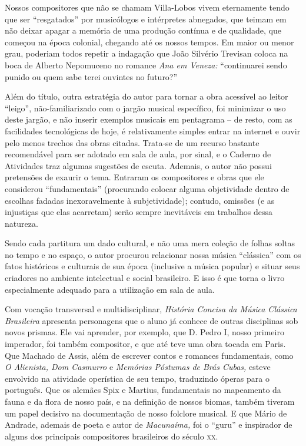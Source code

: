 \documentclass[11pt]{extarticle}
\begin{document}
Nossos compositores que não se chamam Villa-Lobos vivem eternamente
tendo que ser ``resgatados'' por musicólogos e intérpretes abnegados,
que teimam em não deixar apagar a memória de uma produção contínua e de
qualidade, que começou na época colonial, chegando até os nossos tempos.
Em maior ou menor grau, poderiam todos repetir a indagação que João
Silvério Trevisan coloca na boca de Alberto Nepomuceno no romance
\emph{Ana em Veneza:} ``continuarei sendo punido ou quem sabe terei
ouvintes no futuro?''

Além do título, outra estratégia do autor para tornar a obra acessível
ao leitor ``leigo'', não-familiarizado com o jargão musical específico,
foi minimizar o uso deste jargão, e não inserir exemplos musicais em
pentagrama -- de resto, com as facilidades tecnológicas de hoje, é
relativamente simples entrar na internet e ouvir pelo menos trechos das
obras citadas. Trata-se de um recurso bastante recomendável para ser
adotado em sala de aula, por sinal, e o Caderno de Atividades traz
algumas sugestões de escuta. Ademais, o autor não possui pretensões de
exaurir o tema. Entraram os compositores e obras que ele considerou
``fundamentais'' (procurando colocar alguma objetividade dentro de
escolhas fadadas inexoravelmente à subjetividade); contudo, omissões (e
as injustiças que elas acarretam) serão sempre inevitáveis em trabalhos
dessa natureza.

Sendo cada partitura um dado cultural, e não uma mera coleção de folhas
soltas no tempo e no espaço, o autor procurou relacionar nossa música
``clássica'' com os fatos históricos e culturais de sua época (inclusive
a música popular) e situar seus criadores no ambiente intelectual e
social brasileiro. E isso é que torna o livro especialmente adequado
para a utilização em sala de aula.

Com vocação transversal e multidisciplinar, \emph{História Concisa da
Música Clássica Brasileira} apresenta personagens que o aluno já conhece
de outras disciplinas sob novos prismas. Ele vai aprender, por exemplo,
que D. Pedro I, nosso primeiro imperador, foi também compositor, e que
até teve uma obra tocada em Paris. Que Machado de Assis, além de
escrever contos e romances fundamentais, como \emph{O Alienista, Dom
Casmurro} e \emph{Memórias Póstumas de Brás Cubas,} esteve envolvido na
atividade operística de seu tempo, traduzindo óperas para o português.
Que os alemães Spix e Martius, fundamentais no mapeamento da fauna e da
flora de nosso país, e na definição de nossos biomas, também tiveram um
papel decisivo na documentação de nosso folclore musical. E que Mário de
Andrade, ademais de poeta e autor de \emph{Macunaíma,} foi o ``guru'' e
inspirador de alguns dos principais compositores brasileiros do século
\textsc{xx}.
\end{document}
